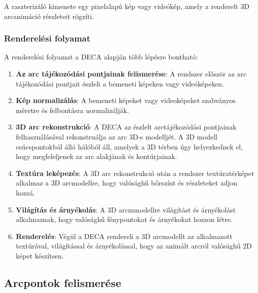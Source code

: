 \documentclass[12pt,a4]{article}
\begin{document}
                A raszterizáló kimenete egy pixelalapú kép vagy videókép, amely a renderelt 3D arcanimáció részleteit rögzíti.

            \subsubsection{Renderelési folyamat}

                A renderelési folyamat a DECA alapján több lépésre bontható:

                \begin{enumerate}
                    \item \textbf{Az arc tájékozódási pontjainak felismerése}: A rendszer először az arc tájékozódási pontjait észleli a bemeneti képeken vagy videóképeken. 

                    \item \textbf{Kép normalizálás}: A bemeneti képeket vagy videoképeket szabványos méretre és felbontásra normalizálják.

                    \item \textbf{3D arc rekonstrukció}: A DECA az észlelt arctájékozódási pontjainak felhasználásával rekonstruálja az arc 3D-s modelljét. A 3D modell csúcspontokból álló hálóból áll, amelyek a 3D térben úgy helyezkednek el, hogy megfeleljenek az arc alakjának és kontúrjainak.

                    \item \textbf{Textúra leképezés}: A 3D arc rekonstrukció után a rendszer textúratérképet alkalmaz a 3D arcmodellre, hogy valósághű bőrszínt és részleteket adjon hozzá.

                    \item \textbf{Világítás és árnyékolás}: A 3D arcmmodellre világítást és árnyékolást alkalmaznak, hogy valósághű fénypontokat és árnyékokat hozzon létre. 

                    \item \textbf{Renderelés}: Végül a DECA rendereli a 3D arcmodellt az alkalmazott textúrával, világítással és árnyékolással, hogy az animált arcról valósághű 2D képet készítsen.
                    
                \end{enumerate}

            \subsection{Arcpontok felismerése} \label{FAN}
\end{document}
